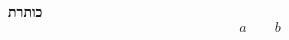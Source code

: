 \newcommand{\fssec}[1]{\par{}\textbf{#1}}
\begin{multicols}{2}
\fssec{כותרת}
\[
a\qquad b
\]
\end{multicols}
